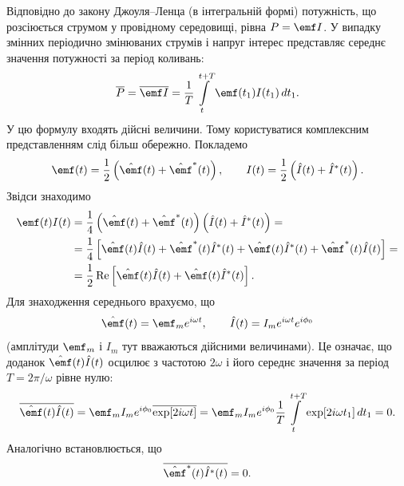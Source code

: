 Відповідно до закону Джоуля--Ленца (в інтегральній формі)
потужність, що розсіюється струмом у провідному середовищі, рівна $P = \emf I$. У
випадку змінних періодично змінюваних струмів і напруг
інтерес представляє середнє значення потужності за період коливань:
\begin{equation}\label{eq:average_power}
	\overline{P} = \overline{\emf I} = \frac{1}{T}\int\limits_{t}^{t+T} \emf(t_1)I(t_1) \, dt_1.
\end{equation}
У цю формулу входять дійсні величини. Тому користуватися
комплексним представленням слід більш обережно. Покладемо
\begin{equation}\label{eq:real_parts}
	\emf(t) = \frac{1}{2}\left(\hat{\emf}(t) + \hat{\emf}^*(t)\right), \qquad
	I(t) = \frac{1}{2}\left(\hat{I}(t) + \hat{I}^*(t)\right).
\end{equation}
Звідси знаходимо
\begin{equation}\label{eq:product_expansion}
	\begin{aligned}
		\emf(t)I(t) & = \frac{1}{4}\left(\hat{\emf}(t) + \hat{\emf}^*(t)\right)\left(\hat{I}(t) + \hat{I}^*(t)\right) =                                         \\
		            & = \frac{1}{4}\left[\hat{\emf}(t)\hat{I}(t) + \hat{\emf}^*(t)\hat{I}^*(t) + \hat{\emf}(t)\hat{I}^*(t) + \hat{\emf}^*(t)\hat{I}(t)\right] = \\
		            & = \frac{1}{2}\operatorname{Re}\left[\hat{\emf}(t)\hat{I}(t) + \hat{\emf}(t)\hat{I}^*(t)\right].
	\end{aligned}
\end{equation}
Для знаходження середнього врахуємо, що
\begin{equation}\label{eq:complex_amplitudes_time}
	\hat{\emf}(t) = \emf_m e^{i\omega t}, \qquad
	\hat{I}(t) = I_m e^{i\omega t} e^{i\phi_0}
\end{equation}
(амплітуди $\emf_m$ і $I_m$ тут вважаються дійсними величинами). Це
означає, що доданок $\hat{\emf}(t)\hat{I}(t)$ осцилює з частотою $2\omega$ і його середнє
значення за період $T = 2\pi/\omega$ рівне нулю:
\begin{equation}\label{eq:fast_oscillating_term}
	\overline{\hat{\emf}(t)\hat{I}(t)} = \emf_m I_m e^{i\phi_0} \overline{\exp[2i\omega t]}
	= \emf_m I_m e^{i\phi_0} \frac{1}{T}\int\limits_{t}^{t+T} \exp[2i\omega t_1] \, dt_1 = 0.
\end{equation}
Аналогічно встановлюється, що
\begin{equation}\label{eq:conjugate_term}
	\overline{\hat{\emf}^*(t)\hat{I}^*(t)} = 0.
\end{equation}
